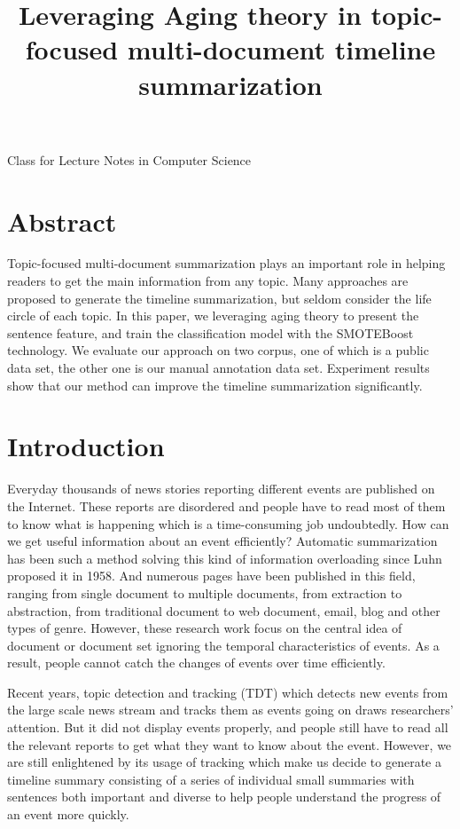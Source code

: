 \documentclass{llncs}
\begin{document}
{\LaTeXe{} Class for Lecture Notes in Computer Science}
\thispagestyle{empty}
\vspace{2pt}
\vfill

%
\title {Leveraging  Aging theory in topic-focused multi-document timeline summarization} 
\maketitle
%
\section{Abstract}

Topic-focused multi-document summarization plays an important role in helping readers to get the main information from any topic. Many approaches are proposed to generate the timeline summarization, but seldom consider the life circle of each topic. In this paper, we leveraging aging theory to present the sentence feature, and train the classification model with the SMOTEBoost technology. We evaluate our approach on two corpus, one of which is a public data set, the other one is our manual annotation data set. Experiment results show that our method can improve the timeline summarization significantly. 


%
\section{Introduction}
%


Everyday thousands of news stories reporting different events are published on the Internet. These reports are disordered and people have to read most of them to know what is happening which is a time-consuming job undoubtedly. How can we get useful information about an event efficiently? Automatic summarization has been such a method solving this kind of information overloading since Luhn \cite{1958-Luhn-p159-165} proposed it in 1958. And numerous pages have been published in this field, ranging from single document to multiple documents, from extraction to abstraction, from traditional document to web document, email, blog and other types of genre. However, these research work focus on the central idea of document or document set ignoring the temporal characteristics of events. As a result, people cannot catch the changes of events over time efficiently. 

Recent years, topic detection and tracking (TDT) which detects new events from the large scale news stream and tracks them as events going on draws researchers' attention. But it did not display events properly, and people still have to read all the relevant reports to get what they want to know about the event. However, we are still enlightened by its usage of tracking which make us decide to generate a timeline summary consisting of a series of individual small summaries with sentences both important and diverse to help people understand the progress of an event more quickly.
\end{document}
